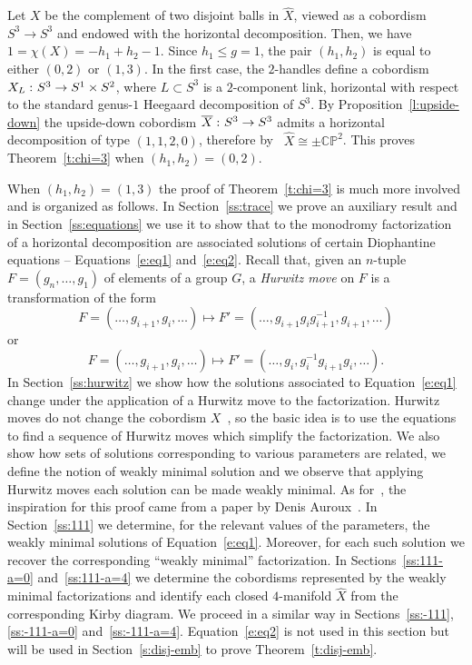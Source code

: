 \documentclass[11pt,a4paper]{amsart}
\newcommand{\CP}{\mathbb{CP}}
\newcommand{\x}{\times}
\newcommand{\co}{\thinspace\colon}
\theoremstyle{definition}
\numberwithin{equation}{section}
\begin{document}
Let $X$ be the complement of two disjoint balls in $\hat X$, viewed as a cobordism $S^3\to S^3$ and endowed with the horizontal decomposition.
Then, we have $1 = \chi(X) = -h_1 + h_2 - 1$. 
Since $h_1\leq g=1$, the pair $(h_1,h_2)$ is equal to either $(0,2)$ or $(1,3)$. In the first case, the $2$-handles define a cobordism $X_L\co S^3\to S^1\x S^2$, where $L\subset S^3$ is a $2$-component link, horizontal with respect to the standard genus-$1$ Heegaard decomposition of $S^3$. 
By Proposition~\ref{l:upside-down} the upside-down cobordism $\overline{X}\co S^3\to S^3$ admits a horizontal decomposition of type $(1,1,2,0)$, therefore by~\cite[Theorem~1]{LP22-2} $\hat X\cong\pm\CP^2$. 
This proves Theorem~\ref{t:chi=3} when $(h_1,h_2)=(0,2)$. 

When $(h_1,h_2)=(1,3)$ the proof of Theorem~\ref{t:chi=3} is much more involved and is organized as follows. 
In Section~\ref{ss:trace} we prove an auxiliary result and in Section~\ref{ss:equations} we use it to show that to the monodromy factorization of a horizontal decomposition are associated solutions of certain Diophantine equations -- Equations~\eqref{e:eq1} and~\eqref{e:eq2}. Recall that, given an $n$-tuple $F=(g_n,\ldots,g_1)$ of elements of a group $G$, a {\em Hurwitz move} on $F$ is a transformation of the form 
\[
F = (\ldots, g_{i+1},g_i,\ldots)\mapsto F'=(\ldots, g_{i+1} g_i g_{i+1}^{-1}, g_{i+1}, \ldots)
\]
or 
\[
F = (\ldots, g_{i+1},g_i,\ldots)\mapsto F'=(\ldots, g_i, g_i^{-1} g_{i+1} g_i, \ldots).
\]
In Section~\ref{ss:hurwitz} we show how the solutions associated to Equation~\eqref{e:eq1} change under the application of a Hurwitz move to the factorization. Hurwitz moves do not change the cobordism $X$~\cite[Prop.~4.6]{LP22-2}, so the basic idea is to use the equations to find a sequence of Hurwitz moves which simplify the factorization. 
We also show how sets of solutions corresponding to various parameters are related, we define the notion of weakly minimal solution and we observe that applying Hurwitz moves each solution can be made weakly minimal. As for~\cite[Theorem~1.7]{LP22-2}, the inspiration for this proof came from a paper by Denis Auroux~\cite{Au15}. In Section~\ref{ss:111} we determine, for the relevant values of the parameters, the weakly minimal solutions of Equation~\eqref{e:eq1}. 
Moreover, for each such solution we recover the corresponding ``weakly minimal'' factorization. 
In Sections~\ref{ss:111-a=0} and~\ref{ss:111-a=4} we determine the cobordisms represented by the weakly minimal factorizations and identify each closed $4$-manifold $\hat X$ from the corresponding Kirby diagram. 
We proceed in a similar way in Sections~\ref{ss:-111}, \ref{ss:-111-a=0} and~\ref{ss:-111-a=4}. 
Equation~\eqref{e:eq2} is not used in this section but will be used in Section~\ref{s:disj-emb} to prove Theorem~\ref{t:disj-emb}.
\end{document}
